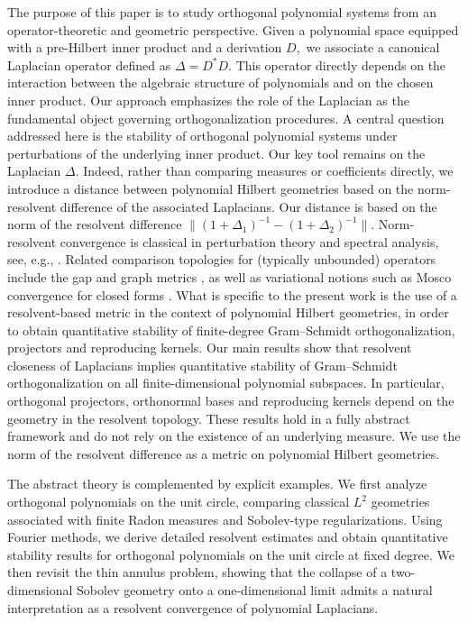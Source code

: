 \documentclass{amsart}
\numberwithin{equation}{section}
\theoremstyle{definition}
\theoremstyle{remark}
\begin{document}
The purpose of this paper is to study orthogonal polynomial systems from an operator-theoretic
and geometric perspective.
Given a polynomial space equipped with a pre-Hilbert inner product and a derivation $D,$
we associate a canonical Laplacian operator defined as $\Delta=D^*D$.
This operator directly depends on the interaction between the algebraic structure of polynomials and on
 the chosen inner product.
Our approach emphasizes the role of the Laplacian as the fundamental object governing
orthogonalization procedures.
A central question addressed here is the stability of orthogonal polynomial systems under
perturbations of the underlying inner product. Our key tool remains on the Laplacian $\Delta$. 
Indeed, rather than comparing measures or coefficients directly, we introduce a distance between
polynomial Hilbert geometries based on the norm-resolvent difference of the associated
Laplacians.
Our distance is based on the norm of the resolvent difference
$\|(1+\Delta_1)^{-1}-(1+\Delta_2)^{-1}\|$.
Norm-resolvent convergence is classical in perturbation theory and spectral analysis,
see, e.g., \cite{Kato,ReedSimon1,Davies}.
Related comparison topologies for (typically unbounded) operators include the gap
and graph metrics \cite{Kato,LeschGap}, as well as variational notions such as Mosco
convergence for closed forms \cite{Mosco,KuwaeShioya}.
What is specific to the present work is the use of a resolvent-based metric in the
context of polynomial Hilbert geometries, in order to obtain quantitative stability of
finite-degree Gram--Schmidt orthogonalization, projectors and reproducing kernels.
Our main results show that resolvent closeness of Laplacians implies quantitative stability
of Gram--Schmidt orthogonalization on all finite-dimensional polynomial subspaces.
In particular, orthogonal projectors, orthonormal bases and reproducing kernels depend
on the geometry in the resolvent topology. These results hold in a fully abstract framework and do not rely on the existence of an
underlying measure. We use the norm of the resolvent difference as a metric on polynomial Hilbert geometries.

The abstract theory is complemented by explicit examples.
We first analyze orthogonal polynomials on the unit circle, comparing classical $L^2$
geometries associated with finite Radon measures and Sobolev-type regularizations.
Using Fourier methods, we derive detailed resolvent estimates and obtain quantitative
stability results for orthogonal polynomials on the unit circle at fixed degree.
We then revisit the thin annulus problem, showing that the collapse of a two-dimensional
Sobolev geometry onto a one-dimensional limit admits a natural interpretation as a
resolvent convergence of polynomial Laplacians.
\end{document}
